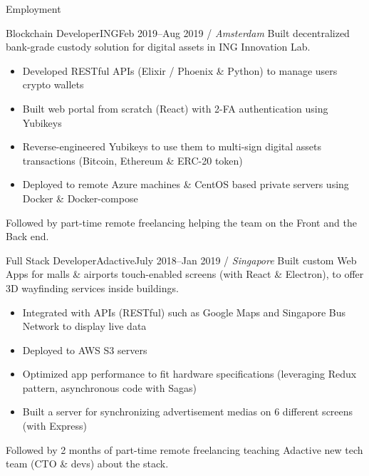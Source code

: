 \documentclass[]{mcdowellcv}
\begin{document}
    \begin{cvsection}{Employment}

        \begin{cvsubsection}{Blockchain Developer}{ING}{Feb 2019--Aug 2019 / \textit{Amsterdam}}
            Built decentralized bank-grade custody solution for digital assets in ING Innovation Lab.
            \begin{itemize}
                \item Developed RESTful APIs (Elixir / Phoenix \& Python) to manage users crypto wallets
                \item Built web portal from scratch (React) with 2-FA authentication using Yubikeys
                \item Reverse-engineered Yubikeys to use them to multi-sign digital assets transactions (Bitcoin, Ethereum \& ERC-20 token)
                \item Deployed to remote Azure machines \& CentOS based private servers using Docker \& Docker-compose
            \end{itemize}
            Followed by part-time remote freelancing helping the team on the Front and the Back end.
        \end{cvsubsection}

        \begin{cvsubsection}{Full Stack Developer}{Adactive}{July 2018--Jan 2019 / \textit{Singapore}}
            Built custom Web Apps for malls \& airports touch-enabled screens (with React \& Electron), to offer 3D wayfinding services inside buildings.
            \begin{itemize}
                \item Integrated with APIs (RESTful) such as Google Maps and Singapore Bus Network to display live data
                \item Deployed to AWS S3 servers
                \item Optimized app performance to fit hardware specifications (leveraging Redux pattern, asynchronous code with Sagas)
                \item Built a server for synchronizing advertisement medias on 6 different screens (with Express)
            \end{itemize}
            Followed by 2 months of part-time remote freelancing teaching Adactive new tech team (CTO \& devs) about the stack.
        \end{cvsubsection}


\end{cvsection}
\end{document}

